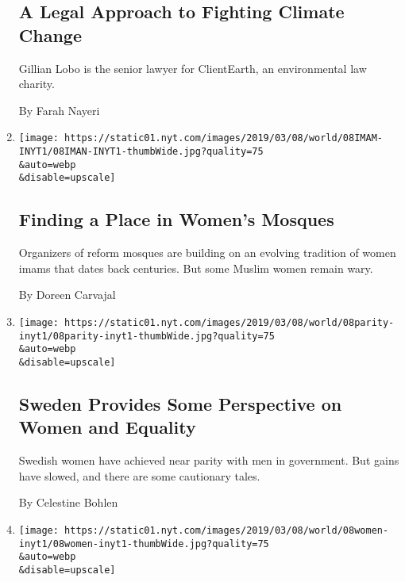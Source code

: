 \begin{enumerate}
{  \subsection{A Legal Approach to Fighting Climate
  Change}\label{a-legal-approach-to-fighting-climate-change}}

  Gillian Lobo is the senior lawyer for ClientEarth, an environmental
  law charity.

  By Farah Nayeri
\item
  \href{/2019/03/08/world/europe/imams-womens-mosques.html}{}

  \texttt{[image: https://static01.nyt.com/images/2019/03/08/world/08IMAM-INYT1/08IMAN-INYT1-thumbWide.jpg?quality=75\\\&auto=webp\\\&disable=upscale]}

  \hypertarget{finding-a-place-in-womens-mosques}{%
  \subsection{Finding a Place in Women's
  Mosques}\label{finding-a-place-in-womens-mosques}}

  Organizers of reform mosques are building on an evolving tradition of
  women imams that dates back centuries. But some Muslim women remain
  wary.

  By Doreen Carvajal
\item
  \href{/2019/03/08/world/europe/sweden-women-equal-representation.html}{}

  \texttt{[image: https://static01.nyt.com/images/2019/03/08/world/08parity-inyt1/08parity-inyt1-thumbWide.jpg?quality=75\\\&auto=webp\\\&disable=upscale]}

  \hypertarget{sweden-provides-some-perspective-on-women-and-equality}{%
  \subsection{Sweden Provides Some Perspective on Women and
  Equality}\label{sweden-provides-some-perspective-on-women-and-equality}}

  Swedish women have achieved near parity with men in government. But
  gains have slowed, and there are some cautionary tales.

  By Celestine Bohlen
\item
  \href{/2019/03/08/world/europe/maria-teresa-marguerite-barankitse.html}{}

  \texttt{[image: https://static01.nyt.com/images/2019/03/08/world/08women-inyt1/08women-inyt1-thumbWide.jpg?quality=75\\\&auto=webp\\\&disable=upscale]}


\end{enumerate}
